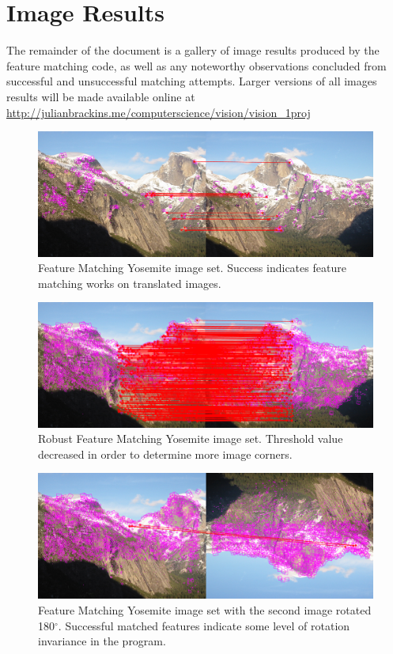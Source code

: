 \documentclass[12pt,journal,compsoc]{IEEEtran}
\begin{document}
\appendices
\section{Image Results}
The remainder of the document is a gallery of image results produced by the feature matching code, as well as any noteworthy observations concluded from successful and unsuccessful matching attempts. Larger versions of all images results will be made available online at {\url{http://julianbrackins.me/computerscience/vision/vision_1proj}}

\begin{figure}[h]
	\centering
		  \centering
		  \includegraphics[width=1\linewidth]{img/yose1}
		  \caption{Feature Matching Yosemite image set. Success indicates feature matching works on translated images.}
		  \label{fig:yose1}
\end{figure}

\begin{figure}[h]
	\centering
		  \centering
		  \includegraphics[width=1\linewidth]{img/yose2}
		  \caption{Robust Feature Matching Yosemite image set. Threshold value decreased in order to determine more image corners.}
		  \label{fig:yose2}
\end{figure}

\begin{figure}[h]
	\centering
		  \centering
		  \includegraphics[width=1\linewidth]{img/yose3}
		  \caption{Feature Matching Yosemite image set with the second image rotated 180$^{\circ}$. Successful matched features indicate some level of rotation invariance in the program.}
		  \label{fig:yose3}
\end{figure}
\end{document}
